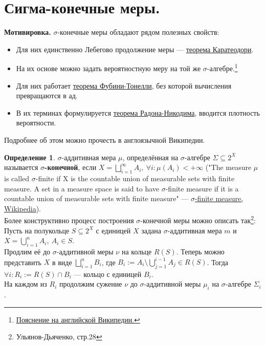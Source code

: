 \documentclass[11pt,a4paper]{report}
\theoremstyle{definition}
\theoremstyle{definition}
\theoremstyle{definition}
\newtheorem{definition}{Определение}[section]
\begin{document}
	\section{Сигма-конечные меры.}
	\textbf{Мотивировка.} $ \sigma $-конечные меры обладают рядом полезных свойств:
	\begin{itemize}
		\item Для них единственно Лебегово продолжение меры — \href{https://goo.gl/DLPJQ1}{теорема Каратеодори}.
		\item На их основе можно задать вероятностную меру на той же $ \sigma $-алгебре.\footnote{\href{https://goo.gl/ZALgvh}{Пояснение на английской Википедии.}}
		\item Для них работает \href{https://goo.gl/hNuFnY}{теорема Фубини-Тонелли}, без которой вычисления превращаются в ад.
		\item В их терминах формулируется \href{https://goo.gl/anNriS}{теорема Радона-Никодима}, вводится плотность вероятности.
	\end{itemize}
	Подробнее об этом можно прочесть в англоязычной Википедии.
	\begin{definition}
		$ \sigma $-аддитивная мера $ \mu $, определённая на $ \sigma $-алгебре $ \Sigma \subseteq 2^{X} $ называется \textbf{$ \sigma $-конечной}, если $ X = \bigsqcup_{i=1}^{\infty}{A_{i}},\ \forall i: \mu(A_{i}) < +\infty $ ("The measure $ \mu $ is called $ \sigma $-finite if X is the countable union of measurable sets with finite measure. A set in a measure space is said to have $ \sigma $-finite measure if it is a countable union of measurable sets with finite measure" — \href{https://en.wikipedia.org/wiki/%CE%A3-finite_measure}{$ \sigma $-finite measure, Wikipedia}).\\
		Более конструктивно процесс построения $ \sigma $-конечной меры можно описать так\footnote{Ульянов-Дьяченко, стр.28}:\\
		Пусть на полукольце $ S \subseteq 2^{X} $ с единицей $ X $ задана $ \sigma $-аддитивная мера $ m $ и $ X = \bigcup\limits_{i=1}^{n}{A_{i}},\ A_{i} \in S $.\\
		Продлим её до $ \sigma $-аддитивной меры $ \nu $ на кольце $ R(S) $. Теперь можно представить $ X $ в виде $ \bigsqcup_{i=1}^{n}{B_{i}} $, где $ B_{i} := A_{i} \setminus \bigcup_{j=1}^{i-1}{A_{j}} \in R(S) $. Тогда $ \forall i: R_{i} := R(S) \cap B_{i} $ — кольцо с единицей $ B_{i} $.\\
		На каждом из $ R_{i} $ продолжим сужение $ \nu $ до $ \sigma $-аддитивной меры $ \mu_{i} $ на $ \sigma $-алгебре $ \Sigma_{i} $.
	\end{definition}
\end{document}
